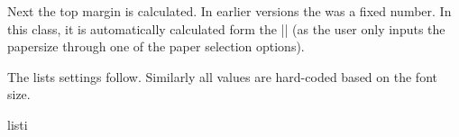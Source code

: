  Next the top margin is calculated.  In earlier versions the  was a fixed number. In this class, it is automatically calculated form the |\paperheight| (as the user only inputs the papersize through one of the paper selection options).


\begin{teX}
\if@compatibility
  \setlength\topmargin{.75in}
\else
  \setlength\topmargin{\paperheight}
  \addtolength\topmargin{-2in}
  \addtolength\topmargin{-\headheight}
  \addtolength\topmargin{-\headsep}
  \addtolength\topmargin{-\textheight}
  \addtolength\topmargin{-\footskip}     %
  \addtolength\topmargin{-.5\topmargin}
  \@settopoint\topmargin
\fi
\end{teX}

The lists settings follow. Similarly all values are hard-coded based on the font size.
\begin{teX}
\setlength{}
\setlength{\skip\footins}{9\p@ \@plus 4\p@ \@minus 2\p@}
\setlength{}
\setlength{}
\setlength{}
\setlength{}
\setlength{}
\setlength{}
\setlength{}
\setlength{}
\setlength{}
\setlength{}
\setlength{}
\end{teX}

\begin{docCommand} {listi} {}
\end{docCommand}
\begin{teX}
\setlength{}
\def\@listi{\leftmargin\leftmargini
            \parsep 4\p@ \@plus2\p@ \@minus\p@
            \topsep 8\p@ \@plus2\p@ \@minus4\p@
            \p@ {}\p@ \@minus\p@}
\let\@listI\@listi
\@listi
\def\@listii {\leftmargin\leftmarginii
              \labelwidth\leftmarginii
              \advance\labelwidth-\labelsep
              \topsep    4\p@ \@plus2\p@ \@minus\p@
              \parsep    2\p@ \@plus\p@  \@minus\p@
              \itemsep   \parsep}
\def\@listiii{\leftmargin\leftmarginiii
              \labelwidth\leftmarginiii
              \advance\labelwidth-\labelsep
              \topsep    2\p@ \@plus\p@\@minus\p@
              \parsep    \z@
              \partopsep \p@ \@plus\z@ \@minus\p@
              \itemsep   \topsep}
\def\@listiv {\leftmargin\leftmarginiv
              \labelwidth\leftmarginiv
              \advance\labelwidth-\labelsep}
\def\@listv  {\leftmargin\leftmarginv
              \labelwidth\leftmarginv
              \advance\labelwidth-\labelsep}
\def\@listvi {\leftmargin\leftmarginvi
              \labelwidth\leftmarginvi
              \advance\labelwidth-\labelsep}


\end{teX}

\endinput









